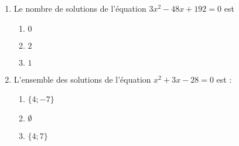 \documentclass[oneside,twocolumn,landscape]{book}
\begin{document}
\begin{enumerate}
\begin{enumerate}
\end{enumerate}


\item Le nombre de solutions de l'équation $3x^{2}-48 x+192=0$ est

\begin{enumerate}

\item\MauvaiseReponse $0$


\item\MauvaiseReponse $2$
\item\BonneReponse $1$

\end{enumerate}



\item L'ensemble des solutions de l'équation $x^{2}+3 x-28=0$ est :

\begin{enumerate}

\item\BonneReponse $\{4 ;-7\}$
\item\MauvaiseReponse $\emptyset$


\item\MauvaiseReponse $\{4 ; 7\}$

\end{enumerate}






\end{enumerate}
\end{document}

